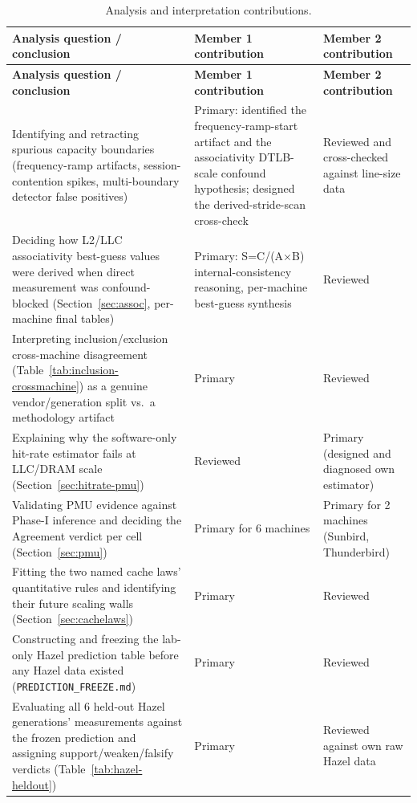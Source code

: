 \documentclass{article}
\begin{document}
\begin{longtable}{|p{5cm}|p{4.5cm}|p{4.5cm}|}
\caption{Analysis and interpretation contributions.}
\label{tab:analysis-contributions} \\

\hline
\textbf{Analysis question / conclusion} &
\textbf{Member 1 contribution} &
\textbf{Member 2 contribution} \\
\hline
\endfirsthead

\hline
\textbf{Analysis question / conclusion} &
\textbf{Member 1 contribution} &
\textbf{Member 2 contribution} \\
\hline
\endhead

Identifying and retracting spurious capacity boundaries (frequency-ramp artifacts, session-contention spikes, multi-boundary detector false positives) & Primary: identified the frequency-ramp-start artifact and the associativity DTLB-scale confound hypothesis; designed the derived-stride-scan cross-check & Reviewed and cross-checked against line-size data \\
\hline

Deciding how L2/LLC associativity best-guess values were derived when direct measurement was confound-blocked (Section~\ref{sec:assoc}, per-machine final tables) & Primary: S=C/(A$\times$B) internal-consistency reasoning, per-machine best-guess synthesis & Reviewed \\
\hline

Interpreting inclusion/exclusion cross-machine disagreement (Table~\ref{tab:inclusion-crossmachine}) as a genuine vendor/generation split vs.\ a methodology artifact & Primary & Reviewed \\
\hline

Explaining why the software-only hit-rate estimator fails at LLC/DRAM scale (Section~\ref{sec:hitrate-pmu}) & Reviewed & Primary (designed and diagnosed own estimator) \\
\hline

Validating PMU evidence against Phase-I inference and deciding the Agreement verdict per cell (Section~\ref{sec:pmu}) & Primary for 6 machines & Primary for 2 machines (Sunbird, Thunderbird) \\
\hline

Fitting the two named cache laws' quantitative rules and identifying their future scaling walls (Section~\ref{sec:cachelaws}) & Primary & Reviewed \\
\hline

Constructing and freezing the lab-only Hazel prediction table before any Hazel data existed (\texttt{PREDICTION\_FREEZE.md}) & Primary & Reviewed \\
\hline

Evaluating all 6 held-out Hazel generations' measurements against the frozen prediction and assigning support/weaken/falsify verdicts (Table~\ref{tab:hazel-heldout}) & Primary & Reviewed against own raw Hazel data \\
\hline

\end{longtable}
\end{document}
